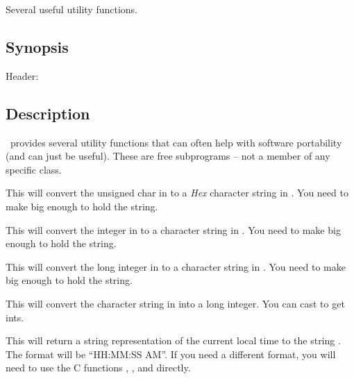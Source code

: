 
Several useful utility functions.

\subsection* {Synopsis}

\begin{description}
	\item [Header:] 
\end{description}

\subsection* {Description}

\V\ provides several utility functions that can often help with
software portability (and can just be useful). These are free
subprograms -- not a member of any specific class.


This will convert the unsigned char in  to a \emph{Hex} character
string in . You need to make  big enough to
hold the string.


This will convert the integer in  to a character
string in . You need to make  big enough
to hold the string.


This will convert the long integer in  to a character
string in . You need to make  big enough
to hold the string.


This will convert the character string in  into a long
integer. You can cast to get ints.


This will return a string representation of the current local time
to the string . The format will be ``HH:MM:SS AM''. If you
need a different format, you will need to use the C functions
, , and  directly.

